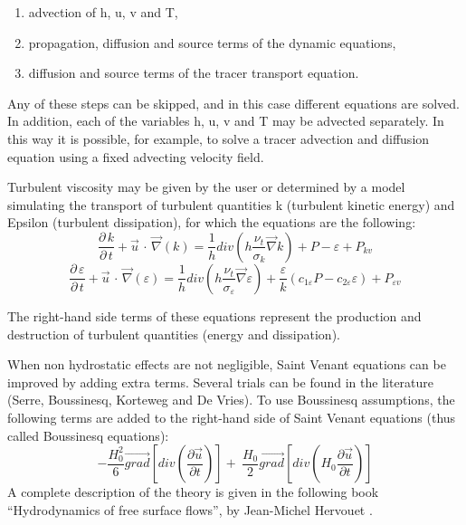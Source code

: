 \begin{enumerate}
\item  advection of h, u, v and T,

\item  propagation, diffusion and source terms of the dynamic equations,

\item  diffusion and source terms of the tracer transport equation.
\end{enumerate}

 Any of these steps can be skipped, and in this case different equations are solved. In addition, each of the variables h, u, v and T may be advected separately. In this way it is possible, for example, to solve a tracer advection and diffusion equation using a fixed advecting velocity field.

 Turbulent viscosity may be given by the user or determined by a model simulating the transport of turbulent quantities k (turbulent kinetic energy) and Epsilon (turbulent dissipation), for which the equations are the following:
\[\frac{\partial \, k}{\partial \, t} +\vec{u}\, \cdot \, \vec{\nabla }(k)=\frac{1}{h} div(h\frac{\nu _{t} }{\sigma _{k} } \vec{\nabla }k)+P-\varepsilon +P_{kv} \]
\[\frac{\partial \, \varepsilon }{\partial \, t} +\vec{u}\, \cdot \, \vec{\nabla }(\varepsilon )=\frac{1}{h} div(h\frac{\nu _{t} }{\sigma _{\varepsilon } } \vec{\nabla }\varepsilon )+\frac{\varepsilon }{k} (c_{1\varepsilon } P-c_{2\varepsilon } \varepsilon )+P_{\varepsilon v} \]


 The right-hand side terms of these equations represent the production and destruction of turbulent quantities (energy and dissipation).

 When non hydrostatic effects are not negligible, Saint Venant equations can be improved by adding extra terms. Several trials can be found in the literature (Serre, Boussinesq, Korteweg and De Vries). To use Boussinesq assumptions, the following terms are added to the right-hand side of Saint Venant equations (thus called Boussinesq equations):
\[-\frac{H^2_0}{6}\overrightarrow{grad}\left[div\left(\frac{\partial \overrightarrow{u}}{\partial t}\right)\right]+\ \frac{H_0}{2}\overrightarrow{grad}\left[div\left(H_0\frac{\partial \overrightarrow{u}}{\partial t}\right)\right]\]
 A complete description of the theory is given in the following book ``Hydrodynamics of free surface flows'', by Jean-Michel Hervouet \cite{Hervouet2007}.

